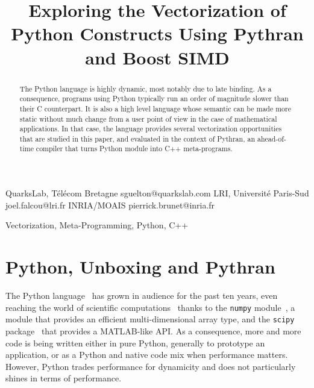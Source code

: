 \documentclass[10pt]{sigplanconf}
\begin{document}
\title{Exploring the Vectorization of Python Constructs Using Pythran and Boost SIMD}

           {QuarksLab, T{\'e}l{\'e}com Bretagne}
           {sguelton@quarkslab.com}
           {LRI, Universit\'e Paris-Sud}
           {joel.falcou@lri.fr}
           {INRIA/MOAIS}
           {pierrick.brunet@inria.fr}

\maketitle

\begin{abstract}

    The Python language is highly dynamic, most notably due to late binding. As
    a consequence, programs using Python typically run an order of magnitude
    slower than their C counterpart. It is also a high level language whose
    semantic can be made more static without much change from a user point of
    view in the case of mathematical applications. In that case, the language
    provides several vectorization opportunities that are studied in this
    paper, and evaluated in the context of Pythran, an ahead-of-time compiler
    that turns Python module into C++ meta-programs.

\end{abstract}



\keywords
Vectorization, Meta-Programming, Python, C++


\section{Python, Unboxing and Pythran}

The Python language~\cite{rossum97} has grown in audience for the past ten
years, even reaching the world of scientific computations~\cite{oliphant2007}
thanks to the \texttt{numpy} module~\cite{numpyarray2011}, a module that
provides an efficient multi-dimensional array type, and the \texttt{scipy}
package~\cite{scipy} that provides a MATLAB-like API. As a consequence, more
and more code is being written either in pure Python, generally to prototype an
application, or as a Python and native code mix when performance matters.
However, Python trades performance for dynamicity and does not particularly
shines in terms of performance.
\end{document}
